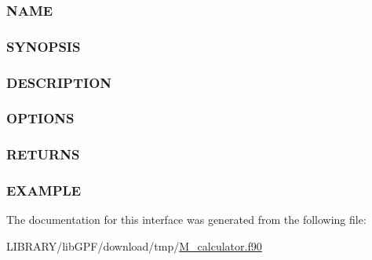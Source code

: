 \subsubsection*{N\+A\+ME}

\subsubsection*{S\+Y\+N\+O\+P\+S\+IS}

\subsubsection*{D\+E\+S\+C\+R\+I\+P\+T\+I\+ON}

\subsubsection*{O\+P\+T\+I\+O\+NS}

\subsubsection*{R\+E\+T\+U\+R\+NS}

\subsubsection*{E\+X\+A\+M\+P\+LE}

The documentation for this interface was generated from the following file\+:\begin{DoxyCompactItemize}
\item 
L\+I\+B\+R\+A\+R\+Y/lib\+G\+P\+F/download/tmp/\hyperlink{M__calculator_8f90}{M\+\_\+calculator.\+f90}\end{DoxyCompactItemize}
